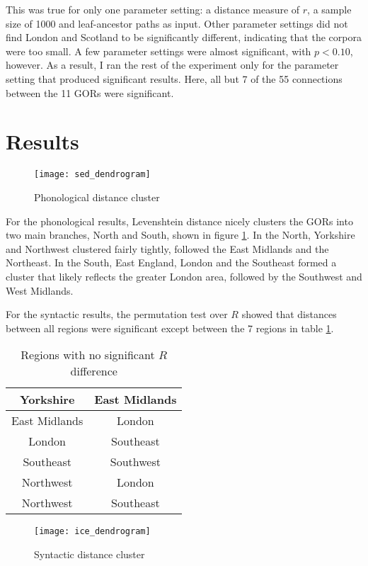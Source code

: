 \documentclass[11pt]{article}
\begin{document}
This was true for only one parameter setting: a distance measure of
$r$, a sample size of 1000 and leaf-ancestor paths as input. Other
parameter settings did not find London and Scotland to be
significantly different, indicating that the corpora were too small. A
few parameter settings were almost significant, with $p < 0.10$,
however.  As a result, I ran the rest of the experiment only for the
parameter setting that produced significant results. Here, all but 7
of the 55 connections between the 11 GORs were significant.

\section{Results}

\begin{figure}
  \texttt{[image: sed\_dendrogram]}
\caption{Phonological distance cluster}
\label{phonology-dendrogram}
\end{figure}

For the phonological results, Levenshtein distance nicely clusters the
GORs into two main branches, North and South, shown in figure
\ref{phonology-dendrogram}. In the North, Yorkshire and Northwest
clustered fairly tightly, followed the East Midlands and the
Northeast. In the South, East England, London and the Southeast formed
a cluster that likely reflects the greater London area, followed by
the Southwest and West Midlands.

For the syntactic results, the permutation test over $R$ showed that
distances between all regions were significant except between the 7
regions in table \ref{syntax-nonsig}.

\begin{table}
\begin{tabular}{cc}
  Yorkshire & East Midlands \\ \hline
  East Midlands & London \\\hline
  London & Southeast \\\hline
  Southeast & Southwest \\\hline
  Northwest & London\\\hline
  Northwest & Southeast \\\hline
\end{tabular}
\caption{Regions with no significant $R$ difference}
\label{syntax-nonsig}
\end{table}

\begin{figure}
  \texttt{[image: ice\_dendrogram]}
\caption{Syntactic distance cluster}
\label{syntax-dendrogram}
\end{figure}
\end{document}
